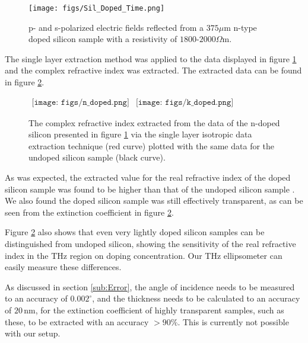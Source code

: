 \begin{figure}[H]
\begin{center}
\texttt{[image: figs/Sil\_Doped\_Time.png]}
\end{center}
\caption[Time domain measurement of lightly doped silicon]{\label{fig:SiliconSingleDopedE0t} p- and s-polarized electric fields reflected from a $375\mu$m n-type doped silicon sample with a resistivity of $1800$-$2000 \Omega$m.}
\end{figure}

The single layer extraction method was applied to the data displayed in figure \ref{fig:SiliconSingleDopedE0t} and the complex refractive index was extracted. The extracted data can be found in figure \ref{fig:SingleSilDopedExt}.

\begin{figure}[H]
                \begin{center}$
								\begin{array}{cc}
                \texttt{[image: figs/n\_doped.png]}&
                \texttt{[image: figs/k\_doped.png]}
								\end{array}$
								\end{center}
	\caption[Extract complex refractive index of single layer n-doped silicon sample]{The complex refractive index extracted from the data of the n-doped silicon presented in figure \ref{fig:SiliconSingleDopedE0t} via the single layer isotropic data extraction technique (red curve) plotted with the same data for the undoped silicon sample (black curve).}
	\label{fig:SingleSilDopedExt}
\end{figure}

As was expected, the extracted value for the real refractive index of the doped silicon sample was found to be higher than that of the undoped silicon sample \cite{Hangyo2002}. 
We also found the doped silicon sample was still effectively transparent, as can be seen from the extinction coefficient in figure \ref{fig:SingleSilDopedExt}. 

Figure \ref{fig:SingleSilDopedExt} also shows that even very lightly doped silicon samples can be distinguished from undoped silicon, showing the sensitivity of the real refractive index in the THz region on doping concentration. Our THz ellipsometer can easily measure these differences.

As discussed in section \ref{sub:Error}, the angle of incidence needs to be measured to an accuracy of $0.002^{\circ}$, and the thickness needs to be calculated to an accuracy of $20\,$nm, for the extinction coefficient of highly transparent samples, such as these, to be extracted with an accuracy $>90\%$. This is currently not possible with our setup.

